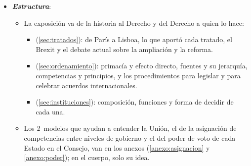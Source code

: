 \documentclass[11pt]{article}
\begin{document}
\begin{itemize}
\item \textbf{\emph{Estructura}}:
  \begin{itemize}
  \item La exposición va de la historia al Derecho y del Derecho a quien lo hace:
    \begin{itemize}
    \item {} (\ref{sec:tratados}): de París a Lisboa, lo que aportó cada tratado, el Brexit y el debate actual sobre la ampliación y la reforma.
    \item {} (\ref{sec:ordenamiento}): primacía y efecto directo, fuentes y su jerarquía, competencias y principios, y los procedimientos para legislar y para celebrar acuerdos internacionales.
    \item {} (\ref{sec:instituciones}): composición, funciones y forma de decidir de cada una.
    \end{itemize}
  \item Los 2~modelos que ayudan a entender la Unión, el de la asignación de competencias entre niveles de gobierno y el del poder de voto de cada Estado en el Consejo, van en los anexos (\ref{anexo:asignacion} y \ref{anexo:poder}); en el cuerpo, solo su idea.
  \end{itemize}
\end{itemize}
\end{document}
